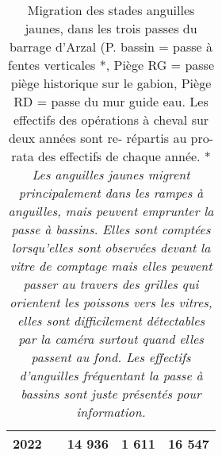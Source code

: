 \begin{table}[ht]
\begin{tabular}{lrrrr}
  2022 &  & 14 936 & 1 611 & 16 547 \\ 
   \hline
\end{tabular}
\caption{Migration des stades anguilles jaunes, dans les
				trois passes du barrage d'Arzal (P. bassin = passe à fentes verticales *, Piège RG = passe piège historique
				sur le gabion, Piège RD = passe du mur guide eau. Les effectifs des opérations à cheval sur deux années sont re-
				répartis au pro-rata des effectifs de chaque année. * \textit{ Les anguilles jaunes migrent principalement dans les rampes à anguilles, mais
				peuvent emprunter la passe à bassins. Elles sont comptées lorsqu'elles sont observées
				devant la vitre de comptage mais elles peuvent passer au travers des grilles qui
				orientent les poissons vers les vitres, elles sont difficilement détectables par
				la caméra surtout quand elles passent au fond. Les effectifs d'anguilles
				fréquentant la passe à bassins sont juste présentés pour information.}} 
\label{table_bilanannuel_ang}
\end{table}
